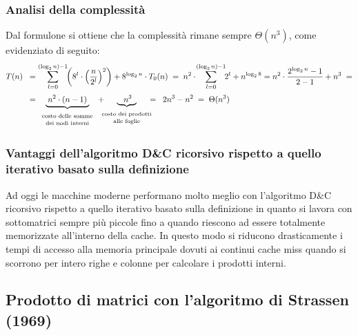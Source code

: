\subsubsection*{Analisi della complessità}
Dal formulone si ottiene che la complessità rimane sempre \(\Theta(n^3)\), come evidenziato di seguito:
\begin{align*}
	T(n) \;\; &= \sum_{l=0}^{(\log_2 n) - 1} \!\! \left( 8^l \cdot \left( \frac{n}{2^l} \right)^2 \right) + 8^{\log_2 n} \cdot T_0(n) \; = \; n^2 \cdot \! \sum_{l=0}^{(\log_2 n) - 1} \!\! 2^l + n^{\log_2 8} = n^2 \cdot \frac{2^{\log_2 n} - 1}{2 - 1} + n^3 \; = \\[3pt]
	&= \underbrace{\;n^2 \cdot (n - 1)\;}_{\begin{array}{c} \text{\scriptsize costo delle somme} \\[-3pt] \text{\scriptsize dei nodi interni} \end{array}}
	+ \!\!\!\!\!\! \underbrace{\;\;\; n^3 \;\;}_{\begin{array}{c} \text{\scriptsize costo dei prodotti} \\[-3pt] \text{\scriptsize alle foglie} \end{array}}
	\!\!\!\!\!\! = \;\; 2n^3 - n^2 \; = \; \Theta(n^3)
\end{align*}

\subsubsection*{Vantaggi dell'algoritmo D\&C ricorsivo rispetto a quello iterativo basato sulla definizione}
Ad oggi le macchine moderne performano molto meglio con l'algoritmo D\&C ricorsivo rispetto a quello iterativo basato sulla
definizione in quanto si lavora con sottomatrici sempre più piccole fino a quando riescono ad essere totalmente memorizzate
all'interno della cache. In questo modo si riducono drasticamente i tempi di accesso alla memoria principale dovuti ai
continui cache miss quando si scorrono per intero righe e colonne per calcolare i prodotti interni.

\subsection{Prodotto di matrici con l'algoritmo di Strassen (1969)}
